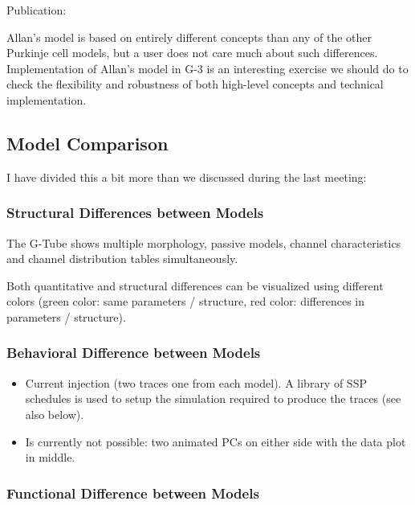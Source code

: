 \documentclass[12pt]{article}
\begin{document}
Publication:~\cite{coop01}

Allan's model is based on entirely different concepts than any of the
other Purkinje cell models, but a user does not care much about such
differences.  Implementation of Allan's model in G-3 is an interesting
exercise we should do to check the flexibility and robustness of both
high-level concepts and technical implementation.


\subsection{Model Comparison}

I have divided this a bit more than we discussed during the last
meeting:

\subsubsection{Structural Differences between Models}

The G-Tube shows multiple morphology, passive models, channel
characteristics and channel distribution tables simultaneously.

Both quantitative and structural differences can be visualized using
different colors (green color: same parameters / structure, red color:
differences in parameters / structure).

\subsubsection{Behavioral Difference between Models}
\begin{itemize}
\item Current injection (two traces one from each model).  A library
  of SSP schedules is used to setup the simulation required to produce
  the traces (see also below).
\item Is currently not possible: two animated PCs on either side with
  the data plot in middle.
\end{itemize}

\subsubsection{Functional Difference between Models}
\end{document}
